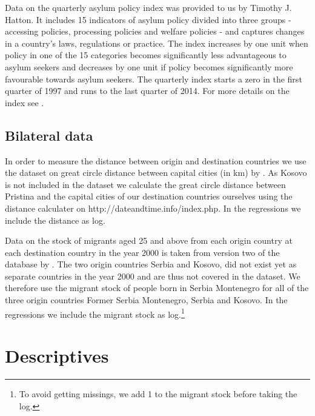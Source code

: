 \documentclass[11pt,a4paper]{scrartcl}
\begin{document}
Data on the quarterly asylum policy index was provided to us by Timothy J. Hatton. It includes 15 indicators of asylum policy divided into three groups - accessing policies, processing policies and welfare policies - and captures changes in a country’s laws, regulations or practice. The index increases by one unit when policy in one of the 15 categories becomes significantly less advantageous to asylum seekers and decreases by one unit if policy becomes significantly more favourable towards asylum seekers. The quarterly index starts a zero in the first quarter of 1997 and runs to the last quarter of 2014. For more details on the index see \textcites{hatton2009, hatton2015}.
\subsection{Bilateral data}

In order to measure the distance between origin and destination countries we use the dataset on great circle distance between capital cities (in km) by \textcite{distance2017}. As Kosovo is not included in the dataset we calculate the great circle distance between Pristina and the capital cities of our destination countries ourselves using the distance calculater on http://dateandtime.info/index.php. In the regressions we include the distance as log.

Data on the stock of migrants aged 25 and above from each origin country at each destination country in the year 2000 is taken from version two of the database by \textcite{artuc2015}. The two origin countries Serbia and Kosovo, did not exist yet as separate countries in the year 2000 and are thus not covered in the dataset. We therefore use the migrant stock of people born in Serbia Montenegro for all of the three origin countries Former Serbia Montenegro, Serbia and Kosovo. In the regressions we include the migrant stock as log.\footnote{To avoid getting missings, we add 1 to the migrant stock before taking the log.} 


\clearpage
\FloatBarrier
\section{Descriptives}


 

% 
% 
\end{document}
